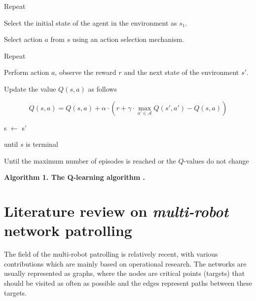 \begin{footnotesize}

\hspace{0cm}Repeat

\hspace{0.25cm}Select the initial state of the agent in the environment as $s_1$.

\hspace{0.25cm}Select action $a$ from $s$ using an action selection mechanism.

\hspace{0.25cm}Repeat

\hspace{0.5cm}Perform action $a$, observe the reward $r$ and the next state of the environment $s'$.

\hspace{0.5cm}Update the value $Q(s,a)$ as follows

$$Q(s,a)=Q(s,a)+\alpha \cdot (r+\gamma \cdot \max_{a' \in \mathcal{A}} Q(s',a')-Q(s,a))$$

\hspace{0.5cm}s $\leftarrow$ s'

\hspace{0.25cm}until $s$ is terminal

\hspace{0cm}Until the maximum number of episodes is reached or the $Q$-values do not change

\end{footnotesize}

{} \hrulefill {} 	  		

\begin{center}
\textbf{Algorithm 1. The Q-learning algorithm \cite{watkins}.}
\end{center}

\newpage
\section{Literature review on \emph{multi-robot} network patrolling}\label{lr}

The field of the multi-robot patrolling is relatively recent, with various contributions which are mainly based on operational research. The networks are usually represented as graphs, where the nodes are critical points (targets) that should be visited as often as possible and the edges represent paths between these  targets. 

